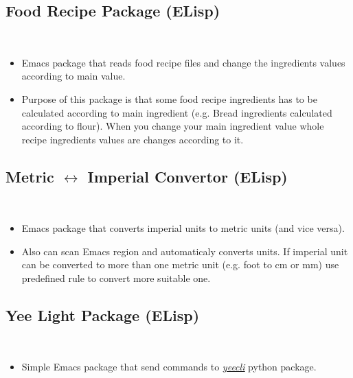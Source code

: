 \documentclass[a4paper, 9pt]{extarticle}
\begin{document}
\subsection{Food Recipe Package (ELisp)} \label{lisp:frp} \hfill \\
\begin{itemize}
	\item Emacs package that reads food recipe files and change the ingredients
	values according to main value.
	\item Purpose of this package is that some food recipe ingredients has to be
	calculated according to main ingredient
	(e.g. Bread ingredients calculated according to flour). When you change your
	main ingredient value whole recipe ingredients values are changes according
	to it.
\end{itemize}


\subsection{Metric $\longleftrightarrow$ Imperial Convertor (ELisp)} \hfill \\
\begin{itemize}
	\item Emacs package that converts imperial units to metric units
	(and vice versa).
	\item Also can scan Emacs region and automaticaly converts units. If imperial
	unit can be converted to more than one metric unit (e.g. foot to cm or mm)
	use predefined rule to convert more suitable one.
\end{itemize}


\subsection{Yee Light Package (ELisp)} \hfill \\
\begin{itemize}
	\item Simple Emacs package that send commands to \underline{\emph{\href{https://gitlab.com/stavros/yeecli/-/tree/master}{yeecli}}} python
		package.
\end{itemize}
\end{document}
